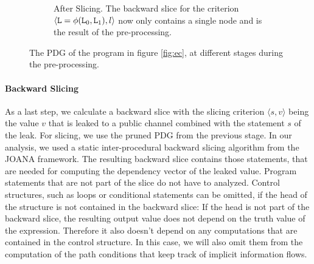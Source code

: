 \begin{figure}
\begin{subfigure}{.7\textwidth}
    \caption{After Slicing. The backward slice for the criterion $\langle \mathtt{L} = \phi(\mathtt{L}_0, \mathtt{L}_1), l \rangle$ now only contains a single node and is the result of the pre-processing.}
    \end{subfigure}
    
    \caption{The PDG of the program in figure \ref{fig:ec}, at different stages during the pre-processing.}
    \label{fig:prune}
\end{figure}

\paragraph{Backward Slicing}
As a last step, we calculate a backward slice with the slicing criterion $\langle s, v \rangle$ being the value $v$ that is leaked to a public channel combined with the statement $s$ of the leak. For slicing, we use the pruned PDG from the previous stage. In our analysis, we used a static inter-procedural backward slicing algorithm from the JOANA framework.
The resulting backward slice contains those statements, that are needed for computing the dependency vector of the leaked value. Program statements that are not part of the slice do not have to analyzed. Control structures, such as loops or conditional statements can be omitted, if the head of the structure is not contained in the backward slice: If the head is not part of the backward slice, the resulting output value does not depend on the truth value of the expression. Therefore it also doesn't depend on any computations that are contained in the control structure. In this case, we will also omit them from the computation of the path conditions that keep track of implicit information flows.

